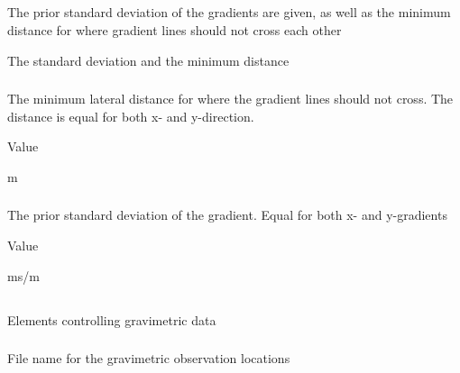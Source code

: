 \subsection{}
 \slist
   \item \Description The prior standard deviation of the gradients are given, as well as the minimum distance for where gradient lines should not cross each other
   \item \Argument The standard deviation and the minimum distance
   \item \Default
 \elist

\subsubsection{}
 \slist
   \item \Description The minimum lateral distance for where the gradient lines should not cross. The distance is equal for both x- and y-direction.
   \item \Argument Value
   \item {} m
 \elist

\subsubsection{}
 \slist
   \item \Description The prior standard deviation of the gradient. Equal for both x- and y-gradients
   \item \Argument Value
   \item {} ms/m
 \elist

\subsection{}
 \slist
\item \Description Elements controlling gravimetric data
   \item \Argument
   \item \Default
 \elist

\subsubsection{}
 \slist
   \item \Description File name for the gravimetric observation locations
   \item \Argument 
   \item \Default 
 \elist

